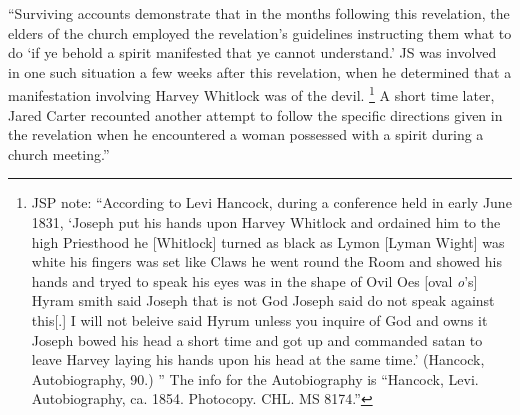 			``Surviving accounts demonstrate that in the months following this revelation, the elders of the church employed the revelation's guidelines instructing them what to do `if ye behold a spirit manifested that ye cannot understand.' JS was involved in one such situation a few weeks after this revelation, when he determined that a manifestation involving Harvey Whitlock was of the devil.%
				\footnote{%
					JSP note: ``According to Levi Hancock, during a conference held in early June 1831, `Joseph put his hands upon Harvey Whitlock and ordained him to the high Priesthood he [Whitlock] turned as black as Lymon [Lyman Wight] was white his fingers was set like Claws he went round the Room and showed his hands and tryed to speak his eyes was in the shape of Ovil Oes [oval \textit{o}'s] Hyram smith said Joseph that is not God Joseph said do not speak against this[.] I will not beleive said Hyrum unless you inquire of God and owns it Joseph bowed his head a short time and got up and commanded satan to leave Harvey laying his hands upon his head at the same time.' (Hancock, Autobiography, 90.) '' The info for the Autobiography is ``Hancock, Levi. Autobiography, ca. 1854. Photocopy. CHL. MS 8174.''
					}
			A short time later, Jared Carter recounted another attempt to follow the specific directions given in the revelation when he encountered a woman possessed with a spirit during a church meeting.''%
